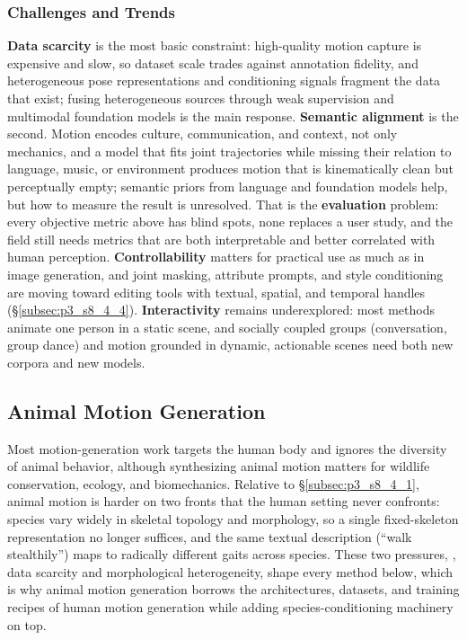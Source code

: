 \subsubsection{Challenges and Trends}
\label{subsubsec:p3_s8_4_1_challenges}
\textbf{Data scarcity} is the most basic constraint: high-quality motion capture is expensive and slow, so dataset scale trades against annotation fidelity, and heterogeneous pose representations and conditioning signals fragment the data that exist; fusing heterogeneous sources through weak supervision and multimodal foundation models is the main response.
\textbf{Semantic alignment} is the second. Motion encodes culture, communication, and context, not only mechanics, and a model that fits joint trajectories while missing their relation to language, music, or environment produces motion that is kinematically clean but perceptually empty; semantic priors from language and foundation models help, but how to measure the result is unresolved.
That is the \textbf{evaluation} problem: every objective metric above has blind spots, none replaces a user study, and the field still needs metrics that are both interpretable and better correlated with human perception.
\textbf{Controllability} matters for practical use as much as in image generation, and joint masking, attribute prompts, and style conditioning are moving toward editing tools with textual, spatial, and temporal handles (§\ref{subsec:p3_s8_4_4}).
\textbf{Interactivity} remains underexplored: most methods animate one person in a static scene, and socially coupled groups (conversation, group dance) and motion grounded in dynamic, actionable scenes need both new corpora and new models.





\subsection{Animal Motion Generation}
\label{subsec:p3_s8_4_2}
Most motion-generation work targets the human body and ignores the diversity of animal behavior, although synthesizing animal motion matters for wildlife conservation, ecology, and biomechanics.
Relative to §\ref{subsec:p3_s8_4_1}, animal motion is harder on two fronts that the human setting never confronts: species vary widely in skeletal topology and morphology, so a single fixed-skeleton representation no longer suffices, and the same textual description (``walk stealthily'') maps to radically different gaits across species.
These two pressures, \ie, data scarcity and morphological heterogeneity, shape every method below, which is why animal motion generation borrows the architectures, datasets, and training recipes of human motion generation while adding species-conditioning machinery on top.



